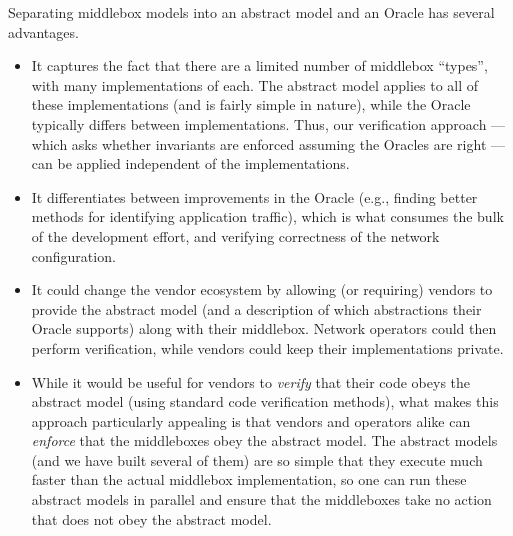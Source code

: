 Separating middlebox models into an abstract model and an Oracle has several advantages.
\begin{itemize}
\item It captures the fact that there are a limited number of middlebox ``types'', with many implementations of each. The abstract model applies to all of these implementations (and is fairly simple in nature), while the Oracle typically differs between implementations.  Thus, our verification approach --- which asks whether invariants are enforced assuming the Oracles are right --- can be applied independent of the implementations.
\item It differentiates between improvements in the Oracle (e.g., finding better methods for identifying application traffic), which is what consumes the bulk of the development effort, and verifying correctness of the network configuration.
\item It could change the vendor ecosystem by allowing (or requiring) vendors to provide the abstract model (and a description of which abstractions their Oracle supports) along with their middlebox.
Network operators could then perform verification, while vendors could keep their implementations private.
\item While it would be useful for vendors to {\em verify} that their code obeys the abstract model (using standard code verification methods), what makes this approach particularly appealing is that vendors and operators alike can {\em enforce} that the middleboxes obey the abstract model. The abstract models (and we have built several of them) are so simple that they execute much faster than the actual middlebox implementation, so one can run these abstract models in parallel and ensure that the middleboxes take no action that does not obey the abstract model.

\end{itemize}


